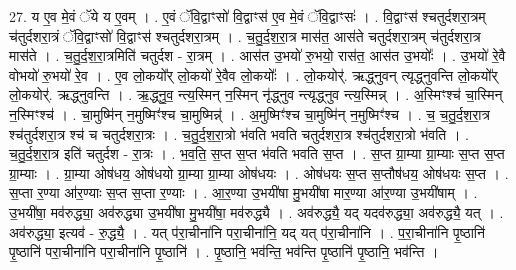 \documentclass[17pt]{extarticle}
\begin{document}
27. य ए॒व मे॒वं ॅये य ए॒वम् । . ए॒वं ॅवि॒द्वाꣳसो॑ वि॒द्वाꣳस॑ ए॒व मे॒वं ॅवि॒द्वाꣳसः॑ । . वि॒द्वाꣳस॑ श्चतुर्दशरा॒त्रम् च॑तुर्दशरा॒त्रं ॅवि॒द्वाꣳसो॑ वि॒द्वाꣳस॑ श्चतुर्दशरा॒त्रम् । . च॒तु॒र्द॒श॒रा॒त्र मास॑त॒ आस॑ते चतुर्दशरा॒त्रम् च॑तुर्दशरा॒त्र मास॑ते । . च॒तु॒र्द॒श॒रा॒त्रमिति॑ चतुर्दश - रा॒त्रम् । . आस॑त उ॒भयो॑ रु॒भयो॒ रास॑त॒ आस॑त उ॒भयोः᳚ । . उ॒भयो॑ रे॒वै वोभयो॑ रु॒भयो॑ रे॒व । . ए॒व लो॒कयो᳚र् लो॒कयो॑ रे॒वैव लो॒कयोः᳚ । . लो॒कयोर्॑. ऋद्ध्नुवन् त्यृद्ध्नुवन्ति लो॒कयो᳚र् लो॒कयोर्॑. ऋद्ध्नुवन्ति । . ऋ॒द्ध्नु॒व॒ न्त्य॒स्मिन् न॒स्मिन् नृ॑द्ध्नुव न्त्यृद्ध्नुव न्त्य॒स्मिन्न् । . अ॒स्मिꣳश्च॑ चा॒स्मिन् न॒स्मिꣳश्च॑ । . चा॒मुष्मि॑न् न॒मुष्मिꣳ॑श्च चा॒मुष्मिन्न्॑ । . अ॒मुष्मिꣳ॑श्च चा॒मुष्मि॑न् न॒मुष्मिꣳ॑श्च । . च॒ च॒तु॒र्द॒श॒रा॒त्र श्च॑तुर्दशरा॒त्र श्च॑ च चतुर्दशरा॒त्रः । . च॒तु॒र्द॒श॒रा॒त्रो भ॑वति भवति चतुर्दशरा॒त्र श्च॑तुर्दशरा॒त्रो भ॑वति । . च॒तु॒र्द॒श॒रा॒त्र इति॑ चतुर्दश - रा॒त्रः । . भ॒व॒ति॒ स॒प्त स॒प्त भ॑वति भवति स॒प्त । . स॒प्त ग्रा॒म्या ग्रा॒म्याः स॒प्त स॒प्त ग्रा॒म्याः । . ग्रा॒म्या ओष॑धय॒ ओष॑धयो ग्रा॒म्या ग्रा॒म्या ओष॑धयः । . ओष॑धयः स॒प्त स॒प्तौष॑धय॒ ओष॑धयः स॒प्त । . स॒प्ता र॒ण्या आ॑र॒ण्याः स॒प्त स॒प्ता र॒ण्याः । . आ॒र॒ण्या उ॒भयी॑षा मु॒भयी॑षा मार॒ण्या आ॑र॒ण्या उ॒भयी॑षाम् । . उ॒भयी॑षा॒ मव॑रुद्ध्या॒ अव॑रुद्ध्या उ॒भयी॑षा मु॒भयी॑षा॒ मव॑रुद्ध्यै । . अव॑रुद्ध्यै॒ यद् यदव॑रुद्ध्या॒ अव॑रुद्ध्यै॒ यत् । . अव॑रुद्ध्या॒ इत्यव॑ - रु॒द्ध्यै॒ । . यत् प॑रा॒चीना॑नि परा॒चीना॑नि॒ यद् यत् प॑रा॒चीना॑नि । . प॒रा॒चीना॑नि पृ॒ष्ठानि॑ पृ॒ष्ठानि॑ परा॒चीना॑नि परा॒चीना॑नि पृ॒ष्ठानि॑ । . पृ॒ष्ठानि॒ भव॑न्ति॒ भव॑न्ति पृ॒ष्ठानि॑ पृ॒ष्ठानि॒ भव॑न्ति । \newline
\end{document}
